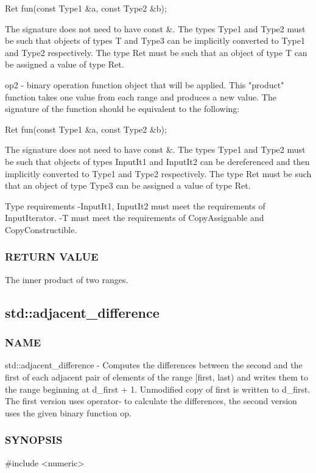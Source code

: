  Ret fun(const Type1 \&a, const Type2 \&b);

The signature does not need to have const \&. The types Type1 and Type2 must be such that objects of types T and Type3 can be implicitly converted to Type1 and Type2 respectively. The type Ret must be such that an object of type T can be assigned a value of type Ret.

op2 - binary operation function object that will be applied.  This "product" function takes one value from each range and produces a new value.
The signature of the function should be equivalent to the following:

 Ret fun(const Type1 \&a, const Type2 \&b);

The signature does not need to have const \&. The types Type1 and Type2 must be such that objects of types InputIt1 and InputIt2 can be dereferenced and then implicitly converted to Type1 and Type2 respectively. The type Ret must be such that an object of type Type3 can be assigned a value of type Ret.

 Type requirements
 -InputIt1, InputIt2 must meet the requirements of InputIterator.
 -T must meet the requirements of CopyAssignable and CopyConstructible.

\subsubsection{RETURN VALUE}
The inner product of two ranges.



\subsection{std::adjacent\_difference}

\subsubsection{NAME}
std::adjacent\_difference - Computes the differences between the second and the first of each adjacent pair of elements of the range [first, last) and writes them to the range beginning at d\_first + 1. Unmodified copy of first is written to d\_first. The first version uses operator- to calculate the differences, the second version uses the given binary function op.

\subsubsection{SYNOPSIS}
\#include <numeric>

